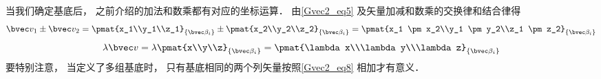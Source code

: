 当我们确定基底后， 之前介绍的加法和数乘都有对应的坐标运算． 由\autoref{Gvec2_eq5} 及矢量加减和数乘的交换律和结合律得
\begin{equation}\label{Gvec2_eq8}
\bvec v_1 \pm \bvec v_2 = \pmat{x_1\\y_1\\z_1}_{\{\bvec\beta_i\}} \pm \pmat{x_2\\y_2\\z_2}_{\{\bvec\beta_i\}} = \pmat{x_1 \pm x_2\\y_1 \pm y_2\\z_1 \pm z_2}_{\{\bvec\beta_i\}}
\end{equation}
\begin{equation}\label{Gvec2_eq9}
\lambda \bvec v = \lambda\pmat{x\\y\\z}_{\{\bvec\beta_i\}} = \pmat{\lambda x\\\lambda y\\\lambda z}_{\{\bvec\beta_i\}}
\end{equation}
要特别注意， 当定义了多组基底时， 只有基底相同的两个列矢量按照\autoref{Gvec2_eq8} 相加才有意义．
